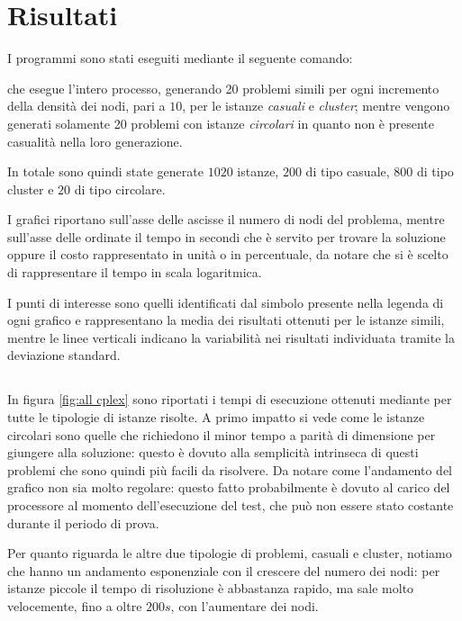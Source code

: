\section{Risultati}
\label{sec:risultati}
I programmi sono stati eseguiti mediante il seguente comando:
\begin{quotation}
\end{quotation}
che esegue l'intero processo, generando 20 problemi simili per ogni incremento della densità dei nodi, pari a $10$, per le istanze \emph{casuali} e \emph{cluster}; mentre vengono generati solamente 20 problemi con istanze \emph{circolari} in quanto non è presente casualità nella loro generazione.

In totale sono quindi state generate $1020$ istanze, $200$ di tipo casuale, $800$ di tipo cluster e $20$ di tipo circolare.

I grafici riportano sull'asse delle ascisse il numero di nodi del problema, mentre sull'asse delle ordinate il tempo in secondi che è servito per trovare la soluzione oppure il costo rappresentato in unità o in percentuale, da notare che si è scelto di rappresentare il tempo in scala logaritmica.


I punti di interesse sono quelli identificati dal simbolo presente nella legenda di ogni grafico e rappresentano la media dei risultati ottenuti per le istanze simili, mentre le linee verticali indicano la variabilità nei risultati individuata tramite la deviazione standard.

\subsection{}

In figura \ref{fig:all cplex} sono riportati i tempi di esecuzione ottenuti mediante  per tutte le tipologie di istanze risolte.
A primo impatto si vede come le istanze circolari sono quelle che richiedono il minor tempo a parità di dimensione per giungere alla soluzione: questo è dovuto alla semplicità intrinseca di questi problemi che sono quindi più facili da risolvere.
Da notare come l'andamento del grafico non sia molto regolare: questo fatto probabilmente è dovuto al carico del processore al momento dell'esecuzione del test, che può non essere stato costante durante il periodo di prova.

Per quanto riguarda le altre due tipologie di problemi, casuali e cluster, notiamo che hanno un andamento esponenziale con il crescere del numero dei nodi: per istanze piccole il tempo di risoluzione è abbastanza rapido, ma sale molto velocemente, fino a oltre $200s$, con l'aumentare dei nodi.

